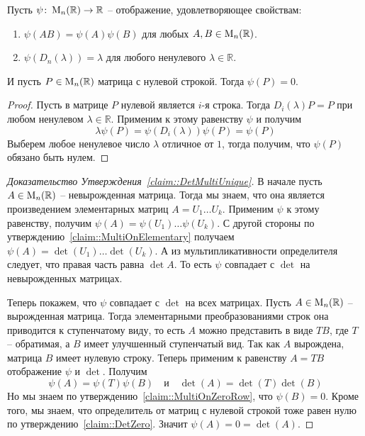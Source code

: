 \begin{claim}
\label{claim::MultiOnZeroRow}
Пусть $\psi\colon \operatorname{M}_{n}(\mathbb R)\to \mathbb R$ -- отображение, удовлетворяющее свойствам:
\begin{enumerate}
\item $\psi(AB) = \psi(A)\psi(B)$ для любых $A,B\in\operatorname{M}_{n}(\mathbb R)$.

\item $\psi(D_n(\lambda)) = \lambda$ для любого ненулевого $\lambda\in\mathbb R$.
\end{enumerate}
И пусть $P\in\operatorname{M}_{n}(\mathbb R)$ матрица с нулевой строкой.
Тогда $\psi(P) = 0$.
\end{claim}
\begin{proof}
Пусть в матрице $P$ нулевой является $i$-я строка.
Тогда $D_i(\lambda) P = P$ при любом ненулевом $\lambda \in \mathbb R$.
Применим к этому равенству $\psi$ и получим
\[
\lambda \psi(P) = \psi(D_i(\lambda)) \psi(P) = \psi(P)
\]
Выберем любое ненулевое число $\lambda$ отличное от $1$, тогда получим, что $\psi(P)$ обязано быть нулем.
\end{proof}

\begin{proof}
[Доказательство Утверждения~\ref{claim::DetMultiUnique}]
В начале пусть $A\in\operatorname{M}_{n}(\mathbb R)$ -- невырожденная матрица.
Тогда мы знаем, что она является произведением элементарных матриц $A = U_1\ldots U_k$.
Применим $\psi$ к этому равенству, получим $\psi(A) = \psi(U_1)\ldots \psi(U_k)$.
С другой стороны по утверждению~\ref{claim::MultiOnElementary} получаем $\psi(A) = \det(U_1)\ldots \det(U_k)$.
А из мультипликативности определителя следует, что правая часть равна $\det A$.
То есть $\psi$ совпадает с $\det$ на невырожденных матрицах.

Теперь покажем, что $\psi$ совпадает с $\det$ на всех матрицах.
Пусть $A\in\operatorname{M}_{n}(\mathbb R)$ -- вырожденная матрица.
Тогда элементарными преобразованиями строк она приводится к ступенчатому виду, то есть $A$ можно представить в виде $TB$, где $T$ -- обратимая, а $B$ имеет улучшенный ступенчатый вид.
Так как $A$ вырождена, матрица $B$ имеет нулевую строку.
Теперь применим к равенству $A = TB$ отображение $\psi$ и $\det$.
Получим
\[
\psi(A) = \psi(T) \psi(B)\quad\text{и}\quad \det(A)=\det(T) \det(B)
\]
Но мы знаем по утверждению~\ref{claim::MultiOnZeroRow}, что $\psi(B) = 0$.
Кроме того, мы знаем, что определитель от матриц с нулевой строкой тоже равен нулю по утверждению~\ref{claim::DetZero}.
Значит $\psi(A) = 0 = \det(A)$.
\end{proof}


